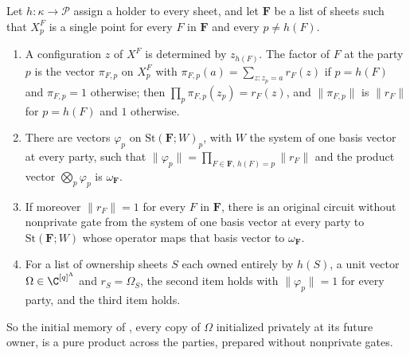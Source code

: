 \begin{theorem}
    \label{thm:party_stack_initialization}
    \leanok
    Let $h:\kappa\to\mathcal P$ assign a holder to every sheet, and let $\mathbf F$ be a list of
    sheets such that $X^F_p$ is a single point for every $F$ in $\mathbf F$ and every $p\neq h(F)$.
    \begin{enumerate}
        \item A configuration $z$ of $X^F$ is determined by $z_{h(F)}$. The factor of $F$ at the
              party $p$ is the vector $\pi_{F,p}$ on $X^F_p$ with
              $\pi_{F,p}(a)=\sum_{z:z_p=a}r_F(z)$ if $p=h(F)$ and $\pi_{F,p}=1$ otherwise; then
              $\prod_p\pi_{F,p}(z_p)=r_F(z)$, and $\lVert\pi_{F,p}\rVert$ is $\lVert r_F\rVert$ for
              $p=h(F)$ and $1$ otherwise.
        \item There are vectors $\varphi_p$ on $\mathrm{St}(\mathbf F;W)_p$, with $W$ the system of
              one basis vector at every party, such that
              $\lVert\varphi_p\rVert=\prod_{F\in\mathbf F,\,h(F)=p}\lVert r_F\rVert$ and the product
              vector $\bigotimes_p\varphi_p$ is $\omega_{\mathbf F}$.
        \item If moreover $\lVert r_F\rVert=1$ for every $F$ in $\mathbf F$, there is an original
              circuit without nonprivate gate from the system of one basis vector at every party
              to $\mathrm{St}(\mathbf F;W)$ whose operator maps that basis vector to
              $\omega_{\mathbf F}$.
        \item For a list of ownership sheets $S$ each owned entirely by $h(S)$, a unit vector
              $\Omega\in\C^{[q]^\Lambda}$ and $r_S=\Omega_S$, the second item holds with
              $\lVert\varphi_p\rVert=1$ for every party, and the third item holds.
    \end{enumerate}
    So the initial memory of \cite[Proposition~7.1]{OpenAI2026PolynomialPEPS}, every copy of
    $\Omega$ initialized privately at its future owner, is a pure product across the parties,
    prepared without nonprivate gates.
\end{theorem}
